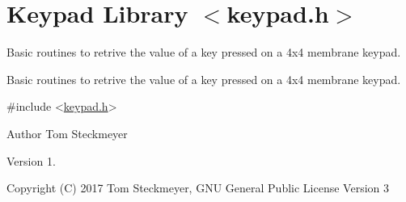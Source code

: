 \hypertarget{group__tstec__keypad}{}\section{Keypad Library $<$keypad.\+h$>$}
\label{group__tstec__keypad}


Basic routines to retrive the value of a key pressed on a 4x4 membrane keypad.  


Basic routines to retrive the value of a key pressed on a 4x4 membrane keypad. 


\begin{DoxyCode}
\textcolor{preprocessor}{#include <\hyperlink{keypad_8h}{keypad.h}>} 
\end{DoxyCode}


\begin{DoxyAuthor}{Author}
Tom Steckmeyer
\end{DoxyAuthor}
\begin{DoxyVersion}{Version}
1.
\end{DoxyVersion}
\begin{DoxyCopyright}{Copyright}
(C) 2017 Tom Steckmeyer, G\+NU General Public License Version 3 
\end{DoxyCopyright}
